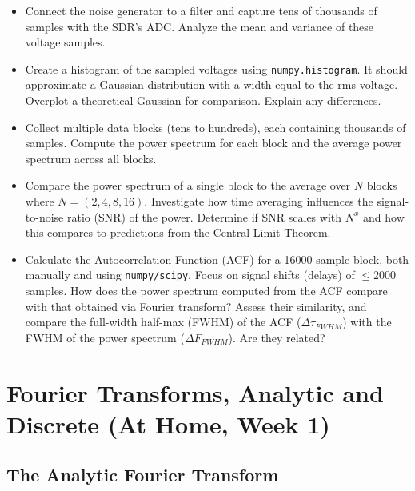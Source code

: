 \documentclass[11pt,preprint]{aastex}
\begin{document}
\begin{itemize}
    \item Connect the noise generator to a filter and capture tens of thousands of samples with the SDR's ADC. Analyze the mean and variance of these voltage samples.
    \item Create a histogram of the sampled voltages using {\tt numpy.histogram}. It should approximate a Gaussian distribution with a width equal to the rms voltage. Overplot a theoretical Gaussian for comparison. Explain any differences.
    \item Collect multiple data blocks (tens to hundreds), each containing thousands of samples. Compute the power spectrum for each block and the average power spectrum across all blocks.
    \item Compare the power spectrum of a single block to the average over $N$ blocks where $N=(2, 4, 8, 16)$. Investigate how time averaging influences the signal-to-noise ratio (SNR) of the power. Determine if SNR scales with $N^x$ and how this compares to predictions from the Central Limit Theorem.
    \item Calculate the Autocorrelation Function (ACF) for a 16000 sample block, both manually and using {\tt numpy/scipy}. Focus on signal shifts (delays) of $\le 2000$ samples. How does the power spectrum computed from the ACF compare with that obtained via Fourier transform? Assess their similarity, and compare the full-width half-max (FWHM) of the ACF ($\Delta \tau_{FWHM}$) with the FWHM of the power spectrum ($\Delta F_{FWHM}$). Are they related?
\end{itemize}


\section{Fourier Transforms, Analytic and Discrete (At Home, Week 1)} 
\label{pwrspectrum}
 
\subsection{The Analytic Fourier Transform}
\end{document}
